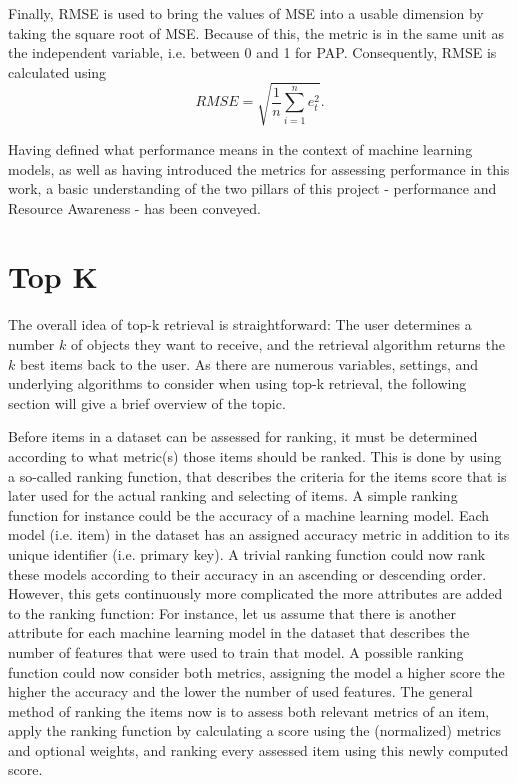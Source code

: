 Finally, RMSE is used to bring the values of MSE into a usable dimension by taking the square root of MSE. Because of this, the metric is in the same unit as the independent variable, i.e. between 0 and 1 for PAP. Consequently, RMSE is calculated using
\begin{equation*}
RMSE = \sqrt{\frac{1}{n} \sum_{i=1}^n e_t^2 }.
\label{rmse}
\end{equation*}


Having defined what performance means in the context of machine learning models, as well as having introduced the metrics for assessing performance in this work, a basic understanding of the two pillars of this project - performance and Resource Awareness - has been conveyed. 



\section{Top K}

The overall idea of top-k retrieval is straightforward: The user determines a number $k$ of objects they want to receive, and the retrieval algorithm returns the $k$ best items back to the user. As there are numerous variables, settings, and underlying algorithms to consider when using top-k retrieval, the following section will give a brief overview of the topic. 

Before items in a dataset can be assessed for ranking, it must be determined according to what metric(s) those items should be ranked. This is done by using a so-called ranking function, that describes the criteria for the items score that is later used for the actual ranking and selecting of items. A simple ranking function for instance could be the accuracy of a machine learning model. Each model (i.e. item) in the dataset has an assigned accuracy metric in addition to its unique identifier (i.e. primary key). A trivial ranking function could now rank these models according to their accuracy in an ascending or descending order. However, this gets continuously more complicated the more attributes are added to the ranking function: For instance, let us assume that there is another attribute for each machine learning model in the dataset that describes the number of features that were used to train that model. A possible ranking function could now consider both metrics, assigning the model a higher score the higher the accuracy and the lower the number of used features. The general method of ranking the items now is to assess both relevant metrics of an item, apply the ranking function by calculating a score using the (normalized) metrics and optional weights, and ranking every assessed item using this newly computed score. 

